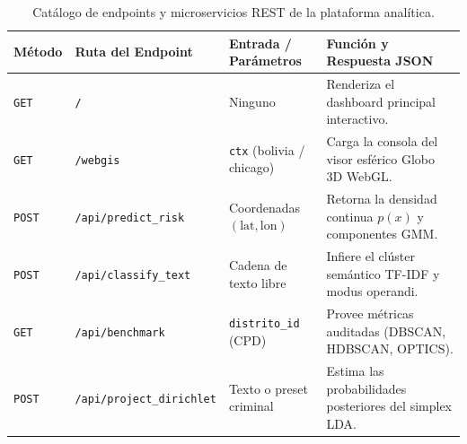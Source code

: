 \begin{table}[htbp]
\centering
\small
\begin{tabularx}{\textwidth}{l l p{4.2cm} X}
\toprule
\textbf{Método} & \textbf{Ruta del Endpoint} & \textbf{Entrada / Parámetros} & \textbf{Función y Respuesta JSON} \\
\midrule
\texttt{GET} & \texttt{/} & Ninguno & Renderiza el dashboard principal interactivo. \\
\texttt{GET} & \texttt{/webgis} & \texttt{ctx} (bolivia / chicago) & Carga la consola del visor esférico Globo 3D WebGL. \\
\texttt{POST} & \texttt{/api/predict\_risk} & Coordenadas $(\text{lat}, \text{lon})$ & Retorna la densidad continua $p(x)$ y componentes GMM. \\
\texttt{POST} & \texttt{/api/classify\_text} & Cadena de texto libre & Infiere el clúster semántico TF-IDF y modus operandi. \\
\texttt{GET} & \texttt{/api/benchmark} & \texttt{distrito\_id} (CPD) & Provee métricas auditadas (DBSCAN, HDBSCAN, OPTICS). \\
\texttt{POST} & \texttt{/api/project\_dirichlet} & Texto o preset criminal & Estima las probabilidades posteriores del simplex LDA. \\
\bottomrule
\end{tabularx}
\caption{Catálogo de endpoints y microservicios REST de la plataforma analítica.}
\label{tab:endpoints_api}
\end{table}

